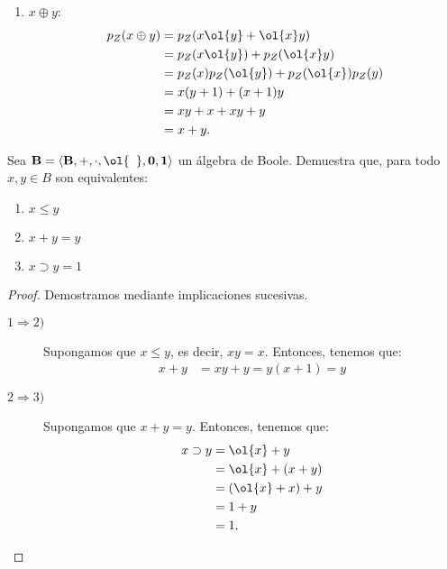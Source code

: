 \begin{ejercicio}
\begin{enumerate}
        \item $x\oplus y$:
        \begin{align*}
            p_Z(x\oplus y) &= p_Z(x\ol{y} + \ol{x}y)\\
            &= p_Z(x\ol{y}) + p_Z(\ol{x}y)\\
            &= p_Z(x)p_Z(\ol{y}) + p_Z(\ol{x})p_Z(y)\\
            &= x(y+1) + (x+1)y\\
            &= xy + x + xy + y\\
            &= x + y.
        \end{align*}
    \end{enumerate}
\end{ejercicio}


\begin{ejercicio}
    Sea $\bf{B}=\langle B,+,\cdot,\ol{\phantom{a}}, 0,1\rangle$ un álgebra de Boole. Demuestra que, para todo $x,y\in B$ son equivalentes:
    \begin{enumerate}
        \item $x\leq y$
        \item $x+y=y$
        \item $x\supset y=1$
    \end{enumerate}
    \begin{proof}
        Demostramos mediante implicaciones sucesivas.
        \begin{description}
            \item[$1\Longrightarrow 2)$]
            
            Supongamos que $x\leq y$, es decir, $xy=x$. Entonces, tenemos que:
            \begin{align*}
                x+y &= xy +y = y(x+1) = y
            \end{align*}

            \item[$2\Longrightarrow 3)$]
            
            Supongamos que $x+y=y$. Entonces, tenemos que:
            \begin{align*}
                x\supset y &= \ol{x} + y\\
                &= \ol{x} + (x+y)\\
                &= (\ol{x} + x) + y\\
                &= 1 + y\\
                &= 1.
            \end{align*}


\end{description}
\end{proof}
\end{ejercicio}
